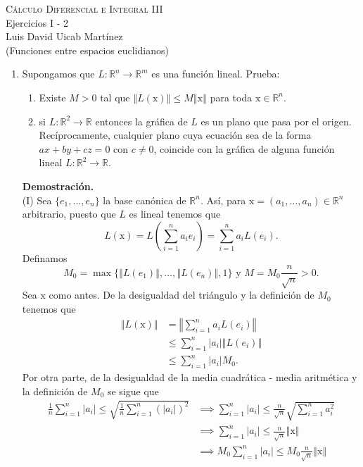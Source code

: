 \documentclass[12pt]{article}
\newcommand{\abs}[1]{\left\vert#1\right\vert}
\newcommand{\norm}[1]{\left\Vert#1\right\Vert}
\newcommand{\R}{\mathbb R}
\newcommand{\x}{\mathrm x}
\newcommand{\To}{\longrightarrow}
\begin{document}
\pagestyle{empty}
\begin{center}
{\textsc{Cálculo Diferencial e Integral III} \\
\medskip 
\large{Ejercicios I - 2 \\
Luis David Uicab Martínez \\
(Funciones entre espacios euclidianos)}}
\end{center}
\bigskip

\begin{enumerate}

\item Supongamos que $L:\R^n\To \R^m$ es una funci\'on lineal. Prueba:
\begin{enumerate}[(1)]
\item Existe $M>0$ tal que $\norm{L(\x)}\leq M\norm{\x}$ para toda 
$\x\in \R^n$.
\item si $L:\R^2\To \R$ entonces la gr\'afica de $L$ es un plano que pasa por el origen. Rec\'iprocamente, cualquier plano cuya ecuaci\'on sea de la forma $ax+by+cz=0$ con $c\neq 0$, coincide con la gr\'afica de alguna funci\'on lineal $L:\R^2\To \R$.
\end{enumerate}
\textbf{Demostración.} \\ (I) Sea $\{e_1,...,e_n\}$ la base canónica de $\R^n$. Así, para $\x=(a_1,\ldots,a_n) \in \R^n$ arbitrario, puesto que $L$ es lineal tenemos que
\[
L(\x) = L\left(\sum_{i=1}^{n}a_ie_i\right) = \sum_{i=1}^{n}a_iL(e_i).
\]
Definamos
\[
M_0=\max\{\norm{L(e_1)},\ldots,\norm{L(e_n)},1\} \text{ y } M=M_0\frac{n}{\sqrt{n}} > 0.
\]
Sea $\x$ como antes. De la desigualdad del triángulo  y la definición de  $M_0$ tenemos que
\begin{align*}
    \norm{L(\x)} &= \norm{\sum_{i=1}^{n}a_iL(e_i)} \\
    &\leq \sum_{i=1}^{n}\abs{a_i}\norm{L(e_i)} \\
    &\leq \sum_{i=1}^{n}\abs{a_i}M_0. \tag{1}
\end{align*}
Por otra parte, de la desigualdad de la media cuadrática - media aritmética y la definición de $M_0$ se sigue que
\begin{align*}
    \frac{1}{n}\sum_{i=1}^{n}\abs{a_i} \leq \sqrt{\frac{1}{n}\sum_{i=1}^{n}\left(\abs{a_i}\right)^2} &\implies \sum_{i=1}^{n}\abs{a_i} \leq \frac{n}{\sqrt{n}}\sqrt{\sum_{i=1}^{n}a_i^2}\\
    &\implies \sum_{i=1}^{n}\abs{a_i} \leq \frac{n}{\sqrt{n}}\norm{\x}\\
    &\implies M_0\sum_{i=1}^{n}\abs{a_i} \leq M_0\frac{n}{\sqrt{n}}\norm{\x}\\

\end{align*}
\end{enumerate}
\end{document}
